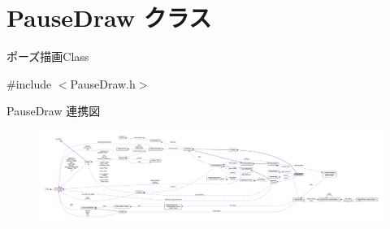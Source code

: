 \hypertarget{class_pause_draw}{}\section{Pause\+Draw クラス}
\label{class_pause_draw}


ポーズ描画\+Class  




{\ttfamily \#include $<$Pause\+Draw.\+h$>$}



Pause\+Draw 連携図\nopagebreak
\begin{figure}[H]
\begin{center}
\leavevmode
\includegraphics[width=350pt]{class_pause_draw__coll__graph}
\end{center}
\end{figure}
